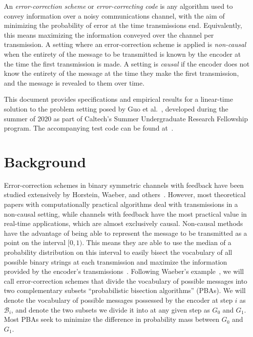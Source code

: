\documentclass{IEEEtran}
\begin{document}
An \textit{error-correction scheme}
or \textit{error-correcting code}
is any algorithm used to convey information over a noisy communications
channel, with the aim of minimizing the probability of error at the time
transmissions end. Equivalently, this means
maximizing the information conveyed over the channel
per transmission. A setting where an error-correction scheme
is applied is \textit{non-causal} when the entirety
of the message to be transmitted is known by the encoder at the time
the first transmission is made. A setting is \textit{causal}
if the encoder does not know the entirety of the message at the time
they make the first transmission, and the message is revealed to them
over time.

This document provides specifications and empirical results for a
linear-time
solution to the problem setting posed by Guo et al.~\cite{guosed},
developed during the summer of 2020 as part of Caltech's Summer
Undergraduate Research Fellowship program. The accompanying
test code can be found at~\cite{cataltepecausal}.

\section{Background}
Error-correction schemes in binary symmetric channels with feedback have been
studied extensively by Horstein, Waeber, and others~\cite{horsteinseq,
waeberbisection,burnashevestimation}.
However, most theoretical papers with computationally practical algorithms
deal with transmissions in a non-causal
setting, while channels with feedback have the most practical value in real-time
applications, which are almost exclusively causal. Non-causal methods have
the advantage of being able to represent the message to be transmitted as
a point on the interval $[0,1)$. This means
they are able to use the median of
a probability distribution on this interval to easily bisect the vocabulary
of all possible binary strings at each transmission and maximize the
information provided by the encoder's transmissions~\cite{waeberbisection}.
Following Waeber's example~\cite{waeberbisection},
we will call error-correction schemes that
divide the vocabulary of possible messages
into two complementary subsets
``probabilistic bisection algorithms'' (PBAs). We will denote the vocabulary
of possible messages possessed by the encoder at step $i$ as $\mathcal{B}_i$,
and denote the two subsets we divide it into
at any given step as $G_0$ and $G_1$.
Most PBAs seek to minimize the difference in probability mass between $G_0$
and $G_1$.
\end{document}
